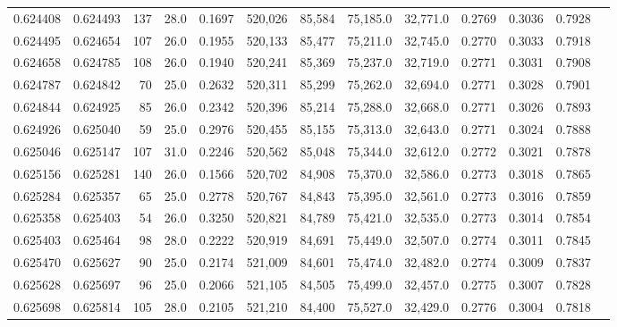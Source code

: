 \begin{tabular}{rrrrrrrrrrrrr}
0.624408 & 0.624493 &   137 & 28.0 &                                     0.1697 & 520,026 &  85,584 &  75,185.0 &  32,771.0 & 0.2769 & 0.3036 & 0.7928 \\
0.624495 & 0.624654 &   107 & 26.0 &                                     0.1955 & 520,133 &  85,477 &  75,211.0 &  32,745.0 & 0.2770 & 0.3033 & 0.7918 \\
0.624658 & 0.624785 &   108 & 26.0 &                                     0.1940 & 520,241 &  85,369 &  75,237.0 &  32,719.0 & 0.2771 & 0.3031 & 0.7908 \\
0.624787 & 0.624842 &    70 & 25.0 &                                     0.2632 & 520,311 &  85,299 &  75,262.0 &  32,694.0 & 0.2771 & 0.3028 & 0.7901 \\
0.624844 & 0.624925 &    85 & 26.0 &                                     0.2342 & 520,396 &  85,214 &  75,288.0 &  32,668.0 & 0.2771 & 0.3026 & 0.7893 \\
0.624926 & 0.625040 &    59 & 25.0 &                                     0.2976 & 520,455 &  85,155 &  75,313.0 &  32,643.0 & 0.2771 & 0.3024 & 0.7888 \\
0.625046 & 0.625147 &   107 & 31.0 &                                     0.2246 & 520,562 &  85,048 &  75,344.0 &  32,612.0 & 0.2772 & 0.3021 & 0.7878 \\
0.625156 & 0.625281 &   140 & 26.0 &                                     0.1566 & 520,702 &  84,908 &  75,370.0 &  32,586.0 & 0.2773 & 0.3018 & 0.7865 \\
0.625284 & 0.625357 &    65 & 25.0 &                                     0.2778 & 520,767 &  84,843 &  75,395.0 &  32,561.0 & 0.2773 & 0.3016 & 0.7859 \\
0.625358 & 0.625403 &    54 & 26.0 &                                     0.3250 & 520,821 &  84,789 &  75,421.0 &  32,535.0 & 0.2773 & 0.3014 & 0.7854 \\
0.625403 & 0.625464 &    98 & 28.0 &                                     0.2222 & 520,919 &  84,691 &  75,449.0 &  32,507.0 & 0.2774 & 0.3011 & 0.7845 \\
0.625470 & 0.625627 &    90 & 25.0 &                                     0.2174 & 521,009 &  84,601 &  75,474.0 &  32,482.0 & 0.2774 & 0.3009 & 0.7837 \\
0.625628 & 0.625697 &    96 & 25.0 &                                     0.2066 & 521,105 &  84,505 &  75,499.0 &  32,457.0 & 0.2775 & 0.3007 & 0.7828 \\
0.625698 & 0.625814 &   105 & 28.0 &                                     0.2105 & 521,210 &  84,400 &  75,527.0 &  32,429.0 & 0.2776 & 0.3004 & 0.7818 \\

\end{tabular}
